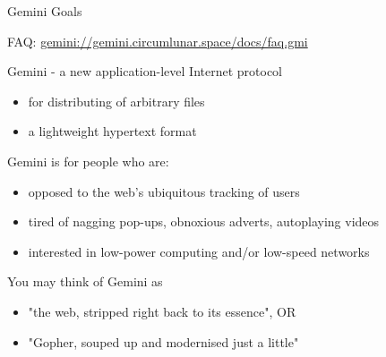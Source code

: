 \documentclass[presentation, 11pt,  aspectratio=169]{beamer}
\begin{document}
\begin{frame}[label={sec:org8721613}]{Gemini Goals}
\begin{tiny}
FAQ: \href{gemini://gemini.circumlunar.space/docs/faq.gmi}{gemini://gemini.circumlunar.space/docs/faq.gmi}\\
\end{tiny}

\begin{block}{Gemini - a new application-level Internet protocol}
\begin{itemize}
\item for distributing of arbitrary files\\
\item a lightweight hypertext format\\
\end{itemize}
\end{block}

\begin{block}{Gemini is for people who are:}
\begin{itemize}
\item opposed to the web's ubiquitous tracking of users\\
\item tired of nagging pop-ups, obnoxious adverts, autoplaying videos\\
\item interested in low-power computing and/or low-speed networks\\
\end{itemize}
\pause
\end{block}
\begin{block}{You may think of Gemini as}
\begin{itemize}
\item "the web, stripped right back to its essence", OR\\
\item "Gopher, souped up and modernised just a little"\\
\end{itemize}
\end{block}
\end{frame}
\end{document}
